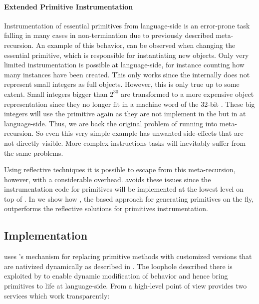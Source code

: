 \paragraph{Extended Primitive Instrumentation}
Instrumentation of essential primitives from lan\-guage-side is an error-prone task falling in many cases in non-termination due to previously described meta-recursion. 
An example of this behavior, can be observed when changing the essential  primitive, which is responsible for instantiating new objects.
Only very limited instrumentation is possible at language-side, for instance counting how many instances have been created.
This only works since the \VM internally does not represent small integers as full objects.
However, this is only true up to some extent.
Small integers bigger than $2^{30}$ are transformed to a more expensive object representation since they no longer fit in a machine word of the 32-bit \VM. 
These big integers will use the  primitive again as they are not implement in the \VM but in at language-side.
Thus, we are back the original problem of running into meta-recursion.
So even this very simple example has unwanted side-effects that are not directly visible.
More complex instructions tasks will inevitably suffer from the same problems.

Using reflective techniques it is possible to escape from this meta-recursion, however, with a considerable overhead.
\WF avoids these issues since the instrumentation code for primitives will be implemented at the lowest level on top of \B.
In  we show how \WF, the \B based approach for generating primitives on the fly, outperforms the reflective solutions for primitives instrumentation. 


\subsection{\WF Implementation}
\WF uses \B's mechanism for replacing primitive methods with customized versions that are nativized dynamically as described in .
The loophole described there is exploited by \WF to enable dynamic modification of \VM behavior and hence bring primitives to life at language-side.
From a high-level point of view \WF provides two services which work transparently: 

